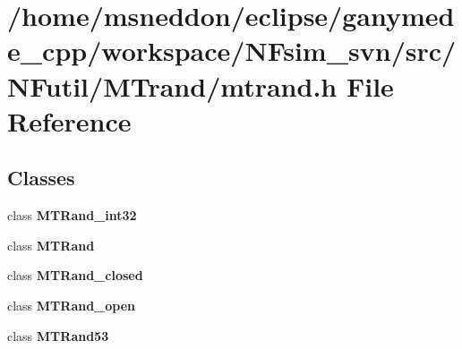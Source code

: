 \section{/home/msneddon/eclipse/ganymede\_\-cpp/workspace/NFsim\_\-svn/src/NFutil/MTrand/mtrand.h File Reference}
\label{mtrand_8h}


\subsection*{Classes}
\begin{CompactItemize}
\item 
class {\bf MTRand\_\-int32}
\item 
class {\bf MTRand}
\item 
class {\bf MTRand\_\-closed}
\item 
class {\bf MTRand\_\-open}
\item 
class {\bf MTRand53}
\end{CompactItemize}
